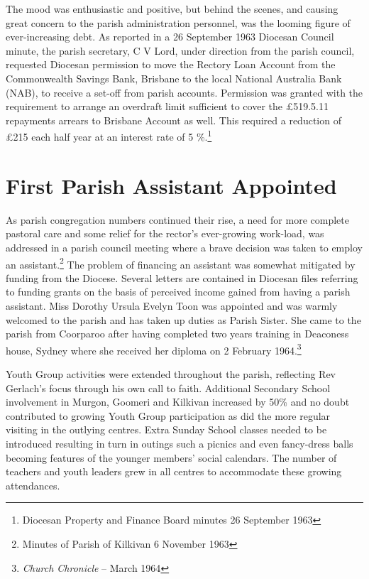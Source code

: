 The mood was enthusiastic and positive, but behind the scenes, and causing great concern to the parish administration personnel, was the looming figure of ever-increasing debt. As reported in a 26 September 1963 Diocesan Council minute, the parish secretary, C V Lord, under direction from the parish council, requested Diocesan permission to move the Rectory Loan Account from the Commonwealth Savings Bank, Brisbane to the local National Australia Bank (NAB), to receive a set-off from parish accounts. Permission was granted with the requirement to arrange an overdraft limit sufficient to cover the \pounds519.5.11 repayments arrears to Brisbane Account as well. This required a reduction of \pounds215 each half year at an interest rate of 5  \%.\footnote{Diocesan Property and Finance Board minutes 26 September 1963}


\section{First Parish Assistant Appointed}



As parish congregation numbers continued their rise, a need for more complete pastoral care and some relief for the rector's ever-growing work-load, was addressed in a parish council meeting where a brave decision was taken to employ an assistant.\footnote{Minutes of Parish of Kilkivan 6 November 1963} The problem of financing an assistant was somewhat mitigated by funding from the Diocese. Several letters are contained in Diocesan files referring to funding grants on the basis of perceived income gained from having a parish assistant. Miss Dorothy Ursula Evelyn Toon was appointed and was warmly welcomed to the parish and has taken up duties as Parish Sister. She came to the parish from Coorparoo after having completed two years training in Deaconess house, Sydney where she received her diploma on 2 February 1964.\footnote{\emph{Church Chronicle} -- March 1964}


Youth Group activities were extended throughout the parish, reflecting Rev Gerlach's focus through his own call to faith. Additional Secondary School involvement in Murgon, Goomeri and Kilkivan increased by 50\% and no doubt contributed to growing Youth Group participation as did the more regular visiting in the outlying centres. Extra Sunday School classes needed to be introduced resulting in turn in outings such a picnics and even fancy-dress balls becoming features of the younger members' social calendars. The number of teachers and youth leaders grew in all centres to accommodate these growing attendances.



